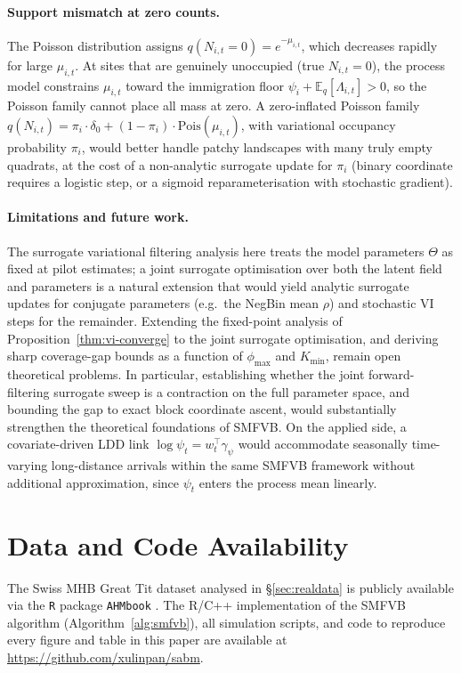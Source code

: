 \documentclass[review,12pt]{elsarticle}
\theoremstyle{definition}
\begin{document}
\paragraph{Support mismatch at zero counts.}
The Poisson distribution assigns $q(N_{i,t}=0)=e^{-\mu_{i,t}}$, which
decreases rapidly for large $\mu_{i,t}$.  At sites that are genuinely
unoccupied (true $N_{i,t}=0$), the process model constrains $\mu_{i,t}$
toward the immigration floor $\psi_i+\mathbb{E}_q[\Lambda_{i,t}]>0$, so
the Poisson family cannot place all mass at zero.  A zero-inflated Poisson
family $q(N_{i,t})=\pi_i\cdot\delta_0+(1-\pi_i)\cdot\mathrm{Pois}(\mu_{i,t})$,
with variational occupancy probability $\pi_i$, would better handle
patchy landscapes with many truly empty quadrats, at the cost of a
non-analytic surrogate update for $\pi_i$ (binary coordinate requires a
logistic step, or a sigmoid reparameterisation with stochastic gradient).

\paragraph{Limitations and future work.}
The surrogate variational filtering analysis here treats the model parameters
$\Theta$ as fixed at pilot estimates; a joint surrogate optimisation over
both the latent field and parameters is a natural extension that would yield
analytic surrogate updates for conjugate parameters (e.g.\ the NegBin mean
$\rho$) and stochastic VI steps for the remainder.  Extending the
fixed-point analysis of Proposition~\ref{thm:vi-converge} to the joint
surrogate optimisation, and deriving sharp
coverage-gap bounds as a function of $\phi_{\max}$ and $K_{\min}$, remain
open theoretical problems.  In particular, establishing whether the joint
forward-filtering surrogate sweep is a contraction on the full parameter
space, and bounding the gap to exact block coordinate ascent, would
substantially strengthen the theoretical foundations of SMFVB.  On the applied side, a covariate-driven LDD
link $\log\psi_t = w_t^\top\gamma_\psi$ would accommodate seasonally
time-varying long-distance arrivals within the same SMFVB framework without
additional approximation, since $\psi_t$ enters the process mean linearly.

\section*{Data and Code Availability}

The Swiss MHB Great Tit dataset analysed in \S\ref{sec:realdata} is publicly
available via the \texttt{R} package \texttt{AHMbook} \citep{kery2021}.
The R/C++ implementation of the SMFVB algorithm
(Algorithm~\ref{alg:smfvb}), all simulation scripts, and code to reproduce
every figure and table in this paper are available at
\url{https://github.com/xulinpan/sabm}.
\end{document}
